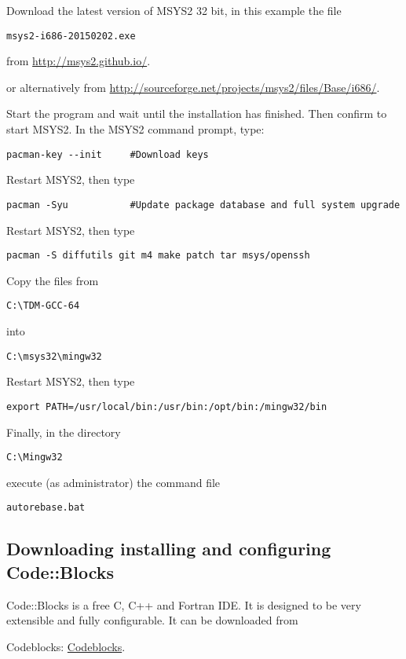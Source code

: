 Download the latest version of MSYS2 32 bit, in this example the file
\begin{verbatim}
msys2-i686-20150202.exe
\end{verbatim}
from \href{http://msys2.github.io/}{http://msys2.github.io/}.

or alternatively from \href{http://sourceforge.net/projects/msys2/files/Base/i686/}{http://sourceforge.net/projects/msys2/files/Base/i686/}.

\vpara
Start the program and wait until the installation has finished. Then confirm to start MSYS2. In the MSYS2 command prompt, type:
\begin{verbatim}
pacman-key --init     #Download keys
\end{verbatim}
Restart MSYS2, then type
\begin{verbatim}
pacman -Syu           #Update package database and full system upgrade
\end{verbatim}
Restart MSYS2, then type
\begin{verbatim}
pacman -S diffutils git m4 make patch tar msys/openssh
\end{verbatim}
Copy the files from 
\begin{verbatim}
C:\TDM-GCC-64
\end{verbatim}
into
\begin{verbatim}
C:\msys32\mingw32
\end{verbatim}
Restart MSYS2, then type
\begin{verbatim}
export PATH=/usr/local/bin:/usr/bin:/opt/bin:/mingw32/bin
\end{verbatim}
Finally, in the directory 
\begin{verbatim}
C:\Mingw32
\end{verbatim}
execute (as administrator) the command file  
\begin{verbatim}
autorebase.bat
\end{verbatim}



\subsection{Downloading installing and configuring Code::Blocks}

Code::Blocks is a free C, C++ and Fortran IDE. It is designed to be very extensible and fully configurable. It can be downloaded from

Codeblocks: \href{http://www.codeblocks.org/home}{Codeblocks}.


